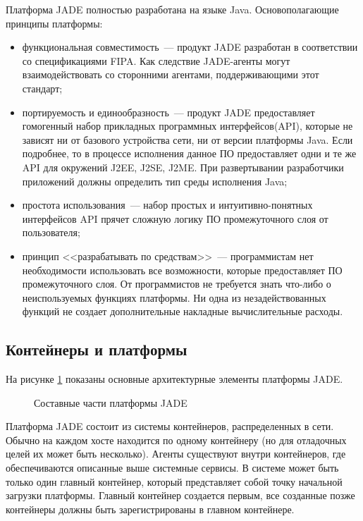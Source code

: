 Платформа JADE полностью разработана на языке Java. Основополагающие принципы платформы:
\begin{itemize}
\item функциональная совместимость~--- продукт JADE разработан в соответствии со спецификациями FIPA. Как следствие JADE-агенты могут взаимодействовать со сторонними агентами, поддерживающими этот стандарт;
\item портируемость и единообразность~--- продукт JADE предоставляет гомогенный набор прикладных программных интерфейсов(API), которые не зависят ни от базового устройства сети, ни от версии платформы Java. Если подробнее, то в процессе исполнения данное ПО предоставляет одни и те же API для окружений J2EE, J2SE, J2ME. При развертывании разработчики приложений должны определить тип среды исполнения Java;
\item простота использования~--- набор простых и интуитивно-понятных интерфейсов API прячет сложную логику ПО промежуточного слоя от пользователя;
\item принцип <<разрабатывать по средствам>>~--- программистам нет необходимости использовать все возможности, которые предоставляет ПО промежуточного слоя. От программистов не требуется знать что-либо о неиспользуемых функциях платформы. Ни одна из незадействованных функций не создает дополнительные накладные вычислительные расходы.
\end{itemize}

\subsection{Контейнеры и платформы}
На рисунке \ref{2:jade} показаны основные архитектурные элементы платформы JADE.
\begin{figure}[h]
\caption{Составные части платформы JADE}
\label{2:jade}
\end{figure}

Платформа JADE состоит из системы контейнеров, распределенных в сети.
Обычно на каждом хосте находится по одному контейнеру (но для отладочных целей их может быть несколько). Агенты существуют внутри контейнеров, где обеспечиваются описанные выше системные сервисы. В системе может быть только один главный контейнер, который представляет собой точку начальной загрузки платформы. Главный контейнер создается первым, все созданные позже контейнеры должны быть зарегистрированы в главном контейнере.


